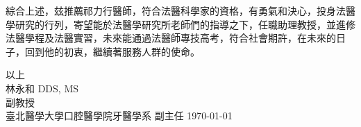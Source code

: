 \documentclass{letter}
\begin{document}
\begin{letter}

綜合上述，玆推薦祁力行醫師，符合法醫科學家的資格，有勇氣和決心，投身法醫學研究的行列，寄望能於法醫學研究所老師們的指導之下，任職助理教授，並進修法醫學程及法醫實習，未來能通過法醫師專技高考，符合社會期許，在未來的日子，回到他的初衷，繼續著服務人群的使命。

\medskip
以上 \vspace{5mm} \\ 
林永和 DDS, MS \\
副教授 \\
臺北醫學大學口腔醫學院牙醫學系 副主任 \hspace{5mm} \today


\clearpage

%


\end{letter}
\end{document}
